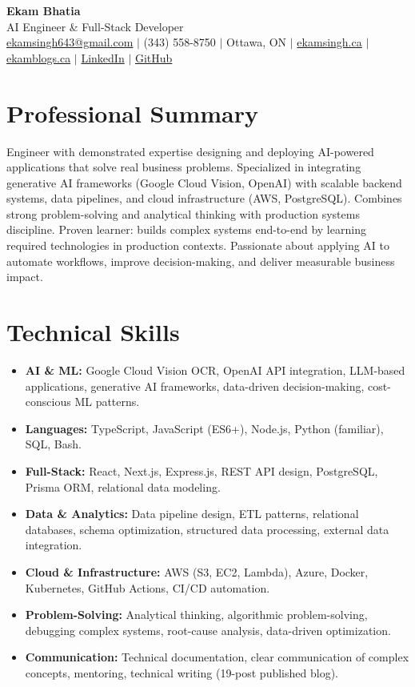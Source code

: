 \documentclass[11pt,a4paper]{article}
\begin{document}
\begin{center}
    {\LARGE \textbf{Ekam Bhatia}} \\
    \vspace{2pt}
    {\normalsize AI Engineer \& Full-Stack Developer } \\
    \vspace{4pt}
    \small
    \href{mailto:ekamsingh643@gmail.com}{ekamsingh643@gmail.com} $|$
    (343) 558-8750 $|$ Ottawa, ON $|$
    \href{https://www.ekamsingh.ca}{ekamsingh.ca} $|$
    \href{https://www.ekamblogs.ca}{ekamblogs.ca} $|$
    \href{https://www.linkedin.com/in/ekam-bhatia-335840168}{LinkedIn} $|$
    \href{https://github.com/bhat0155}{GitHub}
\end{center}

\section{Professional Summary}
Engineer with demonstrated expertise designing and deploying AI-powered applications that solve real business problems. Specialized in integrating generative AI frameworks (Google Cloud Vision, OpenAI) with scalable backend systems, data pipelines, and cloud infrastructure (AWS, PostgreSQL). Combines strong problem-solving and analytical thinking with production systems discipline. Proven learner: builds complex systems end-to-end by learning required technologies in production contexts. Passionate about applying AI to automate workflows, improve decision-making, and deliver measurable business impact.

\section{Technical Skills}
\begin{itemize}
    \item \textbf{AI \& ML:} Google Cloud Vision OCR, OpenAI API integration, LLM-based applications, generative AI frameworks, data-driven decision-making, cost-conscious ML patterns.
    \item \textbf{Languages:} TypeScript, JavaScript (ES6+), Node.js, Python (familiar), SQL, Bash.
    \item \textbf{Full-Stack:} React, Next.js, Express.js, REST API design, PostgreSQL, Prisma ORM, relational data modeling.
    \item \textbf{Data \& Analytics:} Data pipeline design, ETL patterns, relational databases, schema optimization, structured data processing, external data integration.
    \item \textbf{Cloud \& Infrastructure:} AWS (S3, EC2, Lambda), Azure, Docker, Kubernetes, GitHub Actions, CI/CD automation.
    \item \textbf{Problem-Solving:} Analytical thinking, algorithmic problem-solving, debugging complex systems, root-cause analysis, data-driven optimization.
    \item \textbf{Communication:} Technical documentation, clear communication of complex concepts, mentoring, technical writing (19-post published blog).
\end{itemize}
\end{document}
